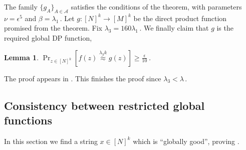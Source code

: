 \documentclass[11pt]{article}
\numberwithin{equation}{section}
\newtheorem{lemma}[theorem]{Lemma}
\theoremstyle{definition}
\theoremstyle{plain}
\newcommand{\Prob}[2][]{\Pr_{{#1}}\left[#2\right]} %
\newcommand{\set}[1]{\{#1\}} %
\newcommand\f{f} %
\newcommand{\g}{g} %
\newcommand\neql[1]{\stackrel{{#1}}{ \approx}} %
\begin{document}
The family $\set{\g_A}_{A\in\mathcal{A}}$ satisfies the conditions of the theorem, with parameters $\nu = \epsilon^5$ and $\beta = \lambda_1$\,. Let $\g:[N]^k\rightarrow[M]^k$ be the direct product function promised from the theorem. 
%
%
%
Fix $\lambda_3 = 160\lambda_1$\,. We finally claim that $g$ is the required global DP function,
\begin{lemma}\label{lem:global DP}
$\Prob[{z\in[N]^k}]{\f(z) \neql{\lambda_3 k}\g(z)}\geq \frac{\epsilon}{10}$\,.
\end{lemma}
The proof appears in . This finishes the proof since $\lambda_3<\lambda$\,.



\subsection{Consistency between restricted global functions} \label{sec:cons}
In this section we find a string $x\in[N]^k$ which is ``globally good'', proving . 
\end{document}
